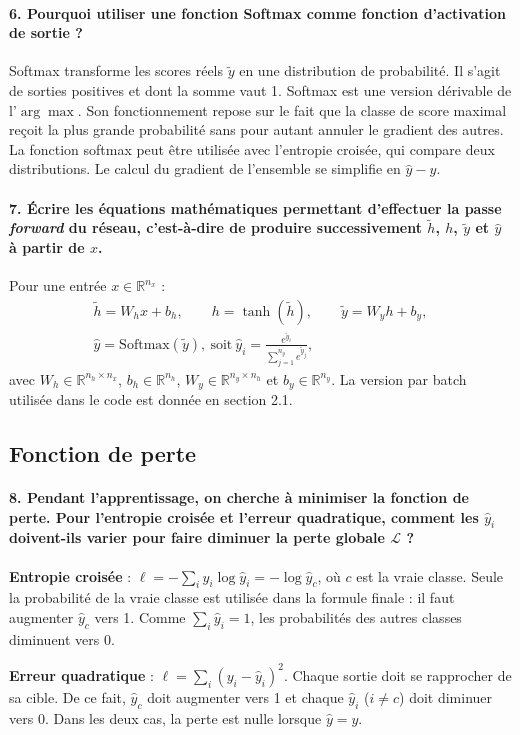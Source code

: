 \documentclass{report}
\begin{document}
\paragraph{6. Pourquoi utiliser une fonction Softmax comme fonction d'activation de sortie ?}
Softmax transforme les scores réels $\tilde{y}$ en une distribution de probabilité. Il s'agit de sorties positives et dont la somme vaut 1. Softmax est une version dérivable de l'$\arg\max$. Son fonctionnement repose sur le fait que la classe de score maximal reçoit la plus grande probabilité sans pour autant annuler le gradient des autres. La fonction softmax peut être utilisée avec l'entropie croisée, qui compare deux distributions. Le calcul du gradient de l'ensemble se simplifie en $\hat{y} - y$.

\paragraph{7. Écrire les équations mathématiques permettant d'effectuer la passe \textit{forward} du réseau, c'est-à-dire de produire successivement $\tilde{h}$, $h$, $\tilde{y}$ et $\hat{y}$ à partir de $x$.}
Pour une entrée $x \in \mathbb{R}^{n_x}$ :
\begin{gather*}
    \tilde{h} = W_h x + b_h, \qquad
    h = \tanh(\tilde{h}), \qquad
    \tilde{y} = W_y h + b_y, \\
    \hat{y} = \mathrm{Softmax}(\tilde{y}), \ \text{soit} \ \hat{y}_i = \frac{e^{\tilde{y}_i}}{\sum_{j=1}^{n_y} e^{\tilde{y}_j}},
\end{gather*}
avec $W_h \in \mathbb{R}^{n_h \times n_x}$, $b_h \in \mathbb{R}^{n_h}$, $W_y \in \mathbb{R}^{n_y \times n_h}$ et $b_y \in \mathbb{R}^{n_y}$. La version par batch utilisée dans le code est donnée en section 2.1.

\subsection{Fonction de perte}
\paragraph{8. Pendant l'apprentissage, on cherche à minimiser la fonction de perte. Pour l'entropie croisée et l'erreur quadratique, comment les $\hat{y}_i$ doivent-ils varier pour faire diminuer la perte globale $\mathcal{L}$ ?}
\begin{itemizeFB}
\item\textbf{Entropie croisée} : $\ell = -\sum_i y_i \log \hat{y}_i = -\log \hat{y}_c$, où $c$ est la vraie classe. Seule la probabilité de la vraie classe est utilisée dans la formule finale : il faut augmenter $\hat{y}_c$ vers 1. Comme $\sum_i \hat{y}_i = 1$, les probabilités des autres classes diminuent vers 0. 
\item\textbf{Erreur quadratique} : $\ell = \sum_i (y_i - \hat{y}_i)^2$. Chaque sortie doit se rapprocher de sa cible. De ce fait, $\hat{y}_c$ doit augmenter vers 1 et chaque $\hat{y}_i$ ($i \neq c$) doit diminuer vers 0. Dans les deux cas, la perte est nulle lorsque $\hat{y} = y$.

\end{itemizeFB}
\end{document}
